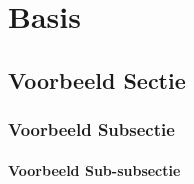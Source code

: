 \chapter{Basis}

\blindtext
\blindtext

\section{Voorbeeld Sectie}

\blindtext

\subsection{Voorbeeld Subsectie}

\blindtext

\subsubsection{Voorbeeld Sub-subsectie}

\blindtext
